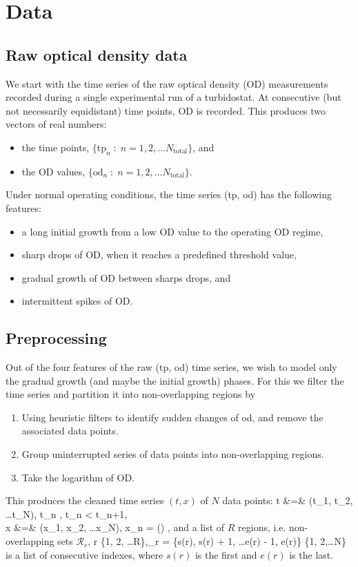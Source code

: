 \section{Data}

\subsection{Raw optical density data}
We start with the time series of the raw optical density (OD) measurements recorded during a single experimental run of a turbidostat. At consecutive (but not necessarily equidistant) time points, OD is recorded. This produces two vectors of real numbers:
\begin{itemize}
	\item the time points, $\{\text{tp}_n\;:\; n = 1,2, \ldots N_\text{total}\}$, and
	\item the OD values, $\{\text{od}_n\;:\; n = 1,2, \ldots N_\text{total}\}$.
\end{itemize}
Under normal operating conditions, the time series (tp, od) has the following features:
\begin{itemize}
	\item a long initial growth from a low OD value to the operating OD regime,
	\item sharp drops of OD, when it reaches a predefined threshold value,
	\item gradual growth of OD between sharps drops, and
	\item intermittent spikes of OD.
\end{itemize}

\subsection{Preprocessing}
Out of the four features of the raw (tp, od) time series, we wish to model only the gradual growth (and maybe the initial growth) phases. For this we filter the time series and partition it into non-overlapping regions by 
\begin{enumerate}
	\item Using heuristic filters to identify sudden changes of od, and remove the associated data points.
	\item Group uninterrupted series of data points into non-overlapping regions.
	\item Take the logarithm of OD.
\end{enumerate}
This produces the cleaned time series $(t, x)$ of $N$ data points:
\ba
	t &=& (t_1, t_2, \ldots t_N), \quad {}\; t_n \in {},\quad {}\; t_n < t_{n+1}, \\
	x &=& (x_1, x_2, \ldots x_N), \quad {}\; x_n = \log() \in {},
\ea
and a list of $R$ regions, i.e. non-overlapping sets $\mathcal{R}_r$,
\be
	r \in \{1, 2, \ldots R\},\qquad {}_r = \{s(r), s(r) + 1, \ldots e(r) - 1, e(r)\} \subset \{1, 2,\ldots N\}
\ee
is a list of consecutive indexes, where $s(r)$ is the first and $e(r)$ is the last.
